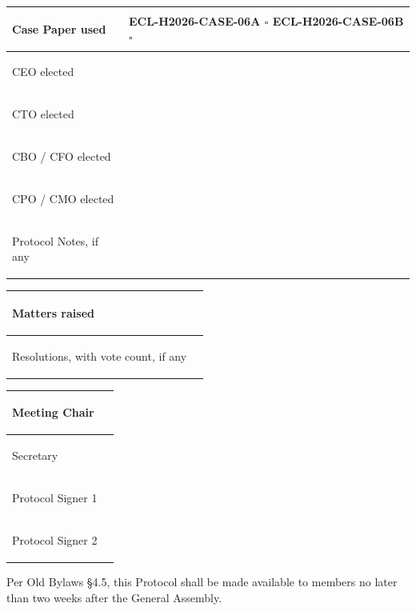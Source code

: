 \documentclass{../../../Common/Latex/Templates/rapport}
\begin{document}
\begin{tabularx}{\textwidth}{|>{\bfseries\raggedright\arraybackslash}p{5cm}|X|}
  \hline
  Case Paper used   & \rule{0pt}{0.9cm}ECL-H2026-CASE-06A \quad $\square$ \quad\quad ECL-H2026-CASE-06B \quad $\square$ \\
  \hline
  CEO elected       & \rule{0pt}{0.9cm}                                                                              \\
  \hline
  CTO elected       & \rule{0pt}{0.9cm}                                                                              \\
  \hline
  CBO / CFO elected & \rule{0pt}{0.9cm}                                                                              \\
  \hline
  CPO / CMO elected & \rule{0pt}{0.9cm}                                                                              \\
  \hline
  Protocol Notes, if any & \rule{0pt}{1.2cm}                                                                         \\
  \hline
\end{tabularx}

\begin{tabularx}{\textwidth}{|>{\bfseries\raggedright\arraybackslash}p{5cm}|X|}
  \hline
  Matters raised                              & \rule{0pt}{1.8cm} \\
  \hline
  Resolutions, with vote count, if any        & \rule{0pt}{1.8cm} \\
  \hline
\end{tabularx}

\rule{0pt}{3cm}

\begin{tabularx}{\textwidth}{|>{\bfseries\raggedright\arraybackslash}p{5cm}|X|}
  \hline
  Meeting Chair     & \rule{0pt}{1.4cm} \\
  \hline
  Secretary         & \rule{0pt}{1.4cm} \\
  \hline
  Protocol Signer 1 & \rule{0pt}{1.4cm} \\
  \hline
  Protocol Signer 2 & \rule{0pt}{1.4cm} \\
  \hline
\end{tabularx}

\vspace{0.4cm}
Per Old Bylaws \S4.5, this Protocol shall be made available to members no later than two weeks after the General Assembly.
\end{document}
